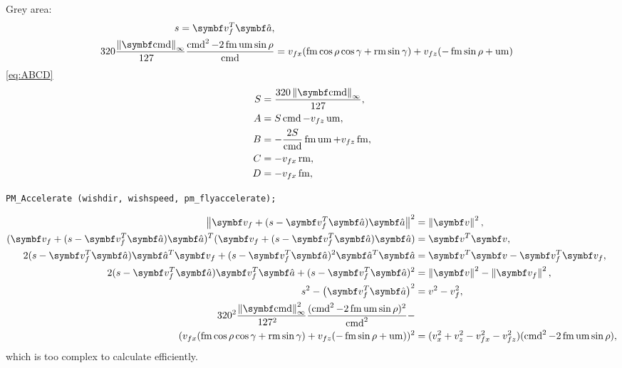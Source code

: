 Grey area:
\begin{align*}
s = \vec{v}_f^T \uvec{a},\\
320\frac{\norm{\vec{\cmd}}_{\infty}}{127\hphantom{_{\infty}}} \frac{\cmd^2  - 2\fmove\umove\sin\rho}{\cmd} &= v_{fx}(\fmove \cos\rho\cos\gamma + \rmove \sin\gamma) + v_{fz}(-\fmove \sin\rho + \umove)
\end{align*}
\eqref{eq:ABCD}
\begin{align*}
S &= \frac{320\norm{\vec{\cmd}}_{\infty}}{127},\\
A &= S\cmd         - v_{fz}\umove,\\
B &= -\frac{2S}{\cmd}\fmove\umove + v_{fz}\fmove,\\
C &= -v_{fx}\rmove,\\
D &= -v_{fx}\fmove,
\end{align*}

\texttt{PM\_Accelerate (wishdir, wishspeed, pm\_flyaccelerate);}

\begin{align*}
\norm{\vec{v}_f + (s - \vec{v}_f^T \uvec{a})\uvec{a}}^2 &= \norm{\vec{v}}^2,\\
(\vec{v}_f + (s - \vec{v}_f^T \uvec{a})\uvec{a})^T (\vec{v}_f + (s - \vec{v}_f^T \uvec{a})\uvec{a}) &= \vec{v}^T \vec{v},\\
2(s - \vec{v}_f^T \uvec{a})\uvec{a}^T \vec{v}_f + (s - \vec{v}_f^T \uvec{a})^2\uvec{a}^T\uvec{a} &= \vec{v}^T \vec{v} - \vec{v}_f^T \vec{v}_f,\\
2(s - \vec{v}_f^T \uvec{a})\vec{v}_f^T \uvec{a} + (s - \vec{v}_f^T \uvec{a})^2 &= \norm{\vec{v}}^2 - \norm{\vec{v}_f}^2,\\
s^2 - \left(\vec{v}_f^T \uvec{a}\right)^2 &= v^2 - v_f^2,\\
320^2\frac{\norm{\vec{\cmd}}_{\infty}^2}{127^2\hphantom{_{\infty}}} \frac{(\cmd^2  - 2\fmove\umove\sin\rho)^2}{\cmd^2} -\\ (v_{fx}(\fmove \cos\rho\cos\gamma + \rmove \sin\gamma) + v_{fz}(-\fmove \sin\rho + \umove))^2 &= (v_x^2 + v_z^2 - v_{fx}^2 - v_{fz}^2) (\cmd^2  - 2\fmove\umove\sin\rho),
\end{align*}
which is too complex to calculate efficiently.
